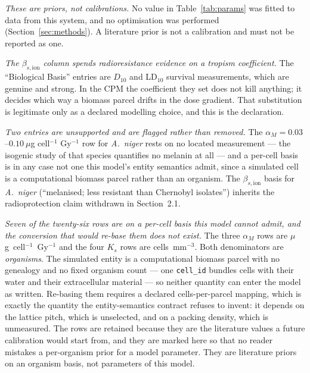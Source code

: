 \documentclass[11pt]{article}
\begin{document}
\emph{These are priors, not calibrations.} No value in Table~\ref{tab:params} was fitted to data
from this system, and no optimisation was performed (Section~\ref{sec:methods}). A literature prior
is not a calibration and must not be reported as one.

\emph{The $\beta_{s,\mathrm{ion}}$ column spends radioresistance evidence on a tropism
coefficient.} The ``Biological Basis'' entries are $D_{10}$ and LD$_{10}$ survival measurements,
which are genuine and strong. In the CPM the coefficient they set does not kill anything; it
decides which way a biomass parcel drifts in the dose gradient. That substitution is legitimate
only as a declared modelling choice, and this is the declaration.

\emph{Two entries are unsupported and are flagged rather than removed.} The
$\alpha_M = 0.03$--$0.10~\mu$g cell$^{-1}$ Gy$^{-1}$ row for \textit{A.\ niger} rests on no located
measurement --- the isogenic study of that species quantifies no melanin at all --- and a per-cell
basis is in any case not one this model's entity semantics admit, since a simulated cell is a
computational biomass parcel rather than an organism. The $\beta_{s,\mathrm{ion}}$ basis for
\textit{A.\ niger} (``melanised; less resistant than Chernobyl isolates'') inherits the
radioprotection claim withdrawn in Section~2.1.

\emph{Seven of the twenty-six rows are on a per-cell basis this model cannot admit, and the
conversion that would re-base them does not exist.} The three $\alpha_M$ rows are
$\mu$g~cell$^{-1}$~Gy$^{-1}$ and the four $K_s$ rows are cells~mm$^{-3}$. Both denominators are
\emph{organisms}. The simulated entity is a computational biomass parcel with no genealogy and no
fixed organism count --- one \texttt{cell\_id} bundles cells with their water and their
extracellular material --- so neither quantity can enter the model as written. Re-basing them
requires a declared cells-per-parcel mapping, which is exactly the quantity the entity-semantics
contract refuses to invent: it depends on the lattice pitch, which is unselected, and on a packing
density, which is unmeasured. The rows are retained because they are the literature values a future
calibration would start from, and they are marked here so that no reader mistakes a per-organism
prior for a model parameter. They are literature priors on an organism basis, not parameters of
this model.
\end{document}
